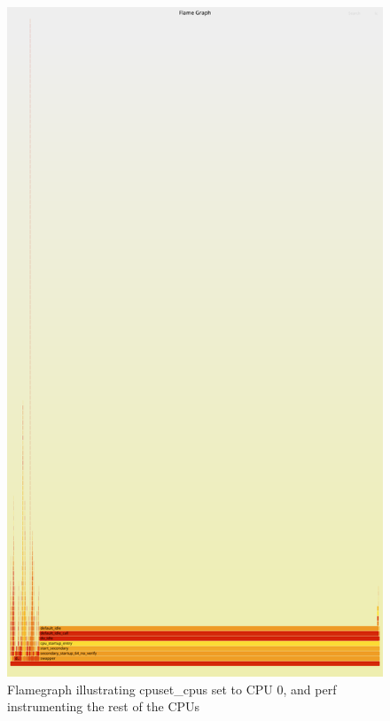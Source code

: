\documentclass{report}  %
\begin{document}
\begin{figure}[H]
    \centering
    \includegraphics[scale=0.2]{cpu_tricks/6.5.5/V1/flamegraph_20241017_112413.png}
    \caption{Flamegraph illustrating cpuset\_cpus set to CPU 0, and perf instrumenting the rest of the CPUs}
    \label{fig:flamegraph}
\end{figure}
\end{document}
